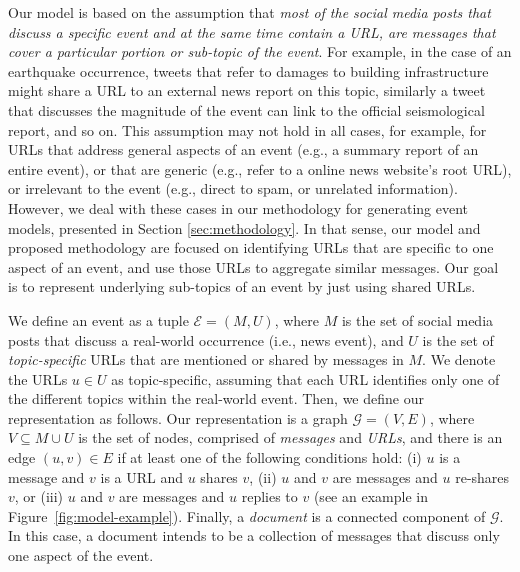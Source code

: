 Our model is based on the assumption that {\em most of the social media posts that discuss a specific event and at the same time contain a URL, are messages that cover a particular portion or sub-topic of the event}.
%
For example, in the case of an earthquake occurrence, tweets that refer to damages
to building infrastructure might share a URL to an external news report on this topic, similarly a tweet that discusses the magnitude of the event can link to the official seismological report, and so on.
%
This assumption may not hold in all cases, for example, for URLs that address general aspects of an event (e.g., a summary report of an
entire event), or that are generic (e.g., refer to a online news website's root URL), or irrelevant to the event (e.g., direct to spam, or unrelated information).
%
However, we deal with these cases in our methodology for generating event models, presented in Section \ref{sec:methodology}.
%
In that sense, our model and proposed methodology are focused on identifying URLs that are specific to one aspect of an event, and use those URLs to aggregate similar messages.
%
Our goal is to represent underlying sub-topics of an event by just using shared URLs.


We define an event as a tuple $\mathcal{E} = (M, U)$, where $M$ is the set of
social media posts that discuss a real-world occurrence (i.e., news event), and $U$ is the set of
{\em topic-specific} URLs that are mentioned or shared by messages in $M$. 
%
We denote the URLs $u\in U$ as {topic-specific}, assuming that each URL identifies only one
of the different topics within the real-world event.
%
Then, we define our representation as follows.
%
Our representation is a graph $\mathcal{G} = (V, E)$, where $V \subseteq M
\cup U$ is the set of nodes, comprised of {\em messages} and {\em URLs}, and
there is an edge $(u, v) \in E$ if at least one of the following conditions
hold: (i) $u$ is a message and $v$ is a URL and $u$ shares $v$, (ii) $u$ and
$v$ are messages and $u$ re-shares $v$, or (iii) $u$ and $v$ are messages and
$u$ replies to $v$ (see an example in Figure~\ref{fig:model-example}).
%
Finally, a {\em document} is a connected component of $\mathcal{G}$.
%
In this case, a document intends to be a collection of messages that discuss only one aspect of the event.


